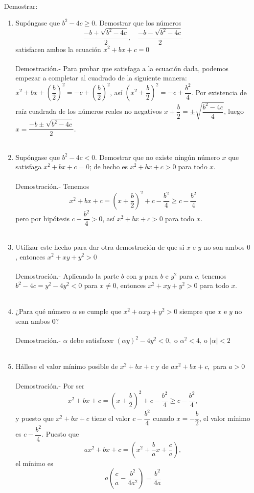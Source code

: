 \begin{teo} Demostrar:\\
\begin{enumerate}[\bfseries a)]
\item Supóngase que $b^2-4c\geq 0$. Demostrar que los números
$$\dfrac{-b+\sqrt{b^2-4c}}{2}, \; \; \; \dfrac{-b- \sqrt{b^2-4c}}{2}$$
satisfacen ambos la ecuación $x^2+bx+c	=0$\\\\
Demostración.- \; Para probar que satisfaga a la ecuación dada, podemos empezar a completar al cuadrado de la siguiente manera: $x^2+bx+\left(\dfrac{b}{2}\right)^2=-c+\left(\dfrac{b}{2}\right)^2$, así $\left( x^2+\dfrac{b}{2} \right)^2=-c+\dfrac{b^2}{4}$. Por existencia de raíz cuadrada de los números reales no negativos $x+\dfrac{b}{2} = \pm \sqrt{\dfrac{b^2-4c}{4}}$, luego $x=\dfrac{-b \pm \sqrt{b^2-4c}}{2}$.\\\\ 
\item Supóngase que $b^2-4c<0$. Demostrar que no existe ningún número $x$ que satisfaga $x^2+bx+c=0$; de hecho es $x^2+bx+c>0$ para todo $x$.\\\\
Demostración.- \: Tenemos $$x^2+bx+c=\left( x+\dfrac{b}{2}\right)^2+c-\dfrac{b^2}{4}\geq c- \dfrac{b^2}{4}$$ pero por hipótesis $c-\dfrac{b^2}{4}>0$, así $x^2+bx+c>0$ para todo $x$. \\\\
\item Utilizar este hecho para dar otra demostración de que si $x$ e $y$ no son ambos $0$, entonces $x^2+xy+y^2>0$\\\\
Demostración.- Aplicando la parte $b$ con $y$ para $b$ e $y^2$ para $c$, tenemos $b^2-4c=y^2-4y^2<0$ para $x \neq 0$, entonces $x^2+xy+y^2>0$ para todo $x$.\\\\ 
\item ¿Para qué número $\alpha$ se cumple que $x^2+\alpha xy + y^2>0$ siempre que $x$ e $y$ no sean ambos $0$?\\\\
Demostración.- \; $\alpha$ debe satisfacer $(\alpha y)^2-4y^2<0,$ o $\alpha^2<4$, o $|\alpha|<2$\\\\
\item Hállese el valor mínimo posible de $x^2+bx+c$ y de $ax^2+bx+c,$ para $a>0$\\\\
Demostración.- \; Por ser $$x^2+bx+c=\left( x+\dfrac{b}{2} \right)^2+ c-\dfrac{b^2}{4}\geq c- \dfrac{b^2}{4},$$ y puesto que $x^2+bx+c$ tiene el valor $c- \dfrac{b^2}{4}$ cuando $x=-\dfrac{b}{2}$, el valor mínimo es $c-\dfrac{b^2}{4}$. Puesto que $$ax^2+bx+c=\left( x^2+\dfrac{b}{a}x+\dfrac{c}{a} \right),$$ el mínimo es $$a\left( \dfrac{c}{a} - \dfrac{b^2}{4a^2} \right) = \dfrac{b^2}{4a}$$\\\\
\end{enumerate}
\end{teo}

